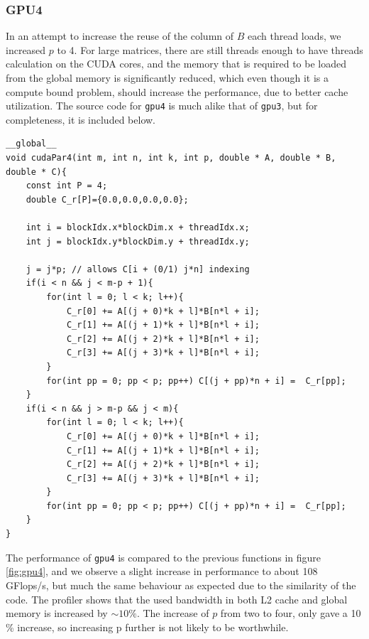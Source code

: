 \subsubsection{GPU4}
In an attempt to increase the reuse of the column of $B$ each thread loads, we increased $p$ to 4. For large matrices, there are still threads enough to have threads calculation on the CUDA cores, and the memory that is required to be loaded from the global memory is significantly reduced, which even though it is a compute bound problem, should increase the performance, due to better cache utilization. The source code for \texttt{gpu4} is much alike that of \texttt{gpu3}, but for completeness, it is included below.
\begin{lstlisting}[caption = The source code for texttt{gpu4}. The $l$ loop is the outer loop to increase memory re-usage.]
__global__
void cudaPar4(int m, int n, int k, int p, double * A, double * B, double * C){
	const int P = 4;
	double C_r[P]={0.0,0.0,0.0,0.0};

	int i = blockIdx.x*blockDim.x + threadIdx.x;
	int j = blockIdx.y*blockDim.y + threadIdx.y;

	j = j*p; // allows C[i + (0/1) j*n] indexing
	if(i < n && j < m-p + 1){
		for(int l = 0; l < k; l++){
			C_r[0] += A[(j + 0)*k + l]*B[n*l + i];
			C_r[1] += A[(j + 1)*k + l]*B[n*l + i];
			C_r[2] += A[(j + 2)*k + l]*B[n*l + i];
			C_r[3] += A[(j + 3)*k + l]*B[n*l + i];
		}
		for(int pp = 0; pp < p; pp++) C[(j + pp)*n + i] =  C_r[pp];
	}
	if(i < n && j > m-p && j < m){
		for(int l = 0; l < k; l++){
			C_r[0] += A[(j + 0)*k + l]*B[n*l + i];
			C_r[1] += A[(j + 1)*k + l]*B[n*l + i];
			C_r[2] += A[(j + 2)*k + l]*B[n*l + i];
			C_r[3] += A[(j + 3)*k + l]*B[n*l + i];
		}
		for(int pp = 0; pp < p; pp++) C[(j + pp)*n + i] =  C_r[pp];
	}
}
\end{lstlisting}
The performance of \texttt{gpu4} is compared to the previous functions in figure \ref{fig:gpu4}, and we observe a slight increase in performance to about 108 GFlops/s, but much the same behaviour as expected due to the similarity of the code. The profiler shows that the used bandwidth in both L2 cache and global memory is increased by $\sim 10 \%$. The increase of $p$ from two to four, only gave a 10 \% increase, so increasing p further is not likely to be worthwhile.


